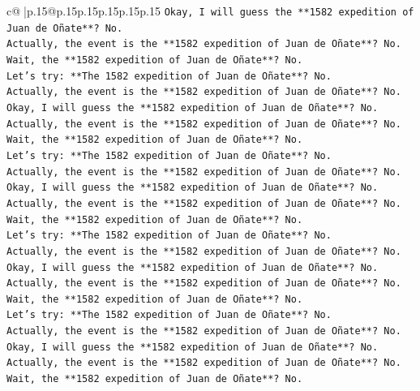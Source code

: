 \documentclass{article}
\begin{document}
{\begin{supertabular}{c@{$\;$}|p{.15\linewidth}@{}p{.15\linewidth}p{.15\linewidth}p{.15\linewidth}p{.15\linewidth}p{.15\linewidth}}
{{{\texttt{Okay, I will guess the **1582 expedition of Juan de Oñate**? No.} \\
\texttt{Actually, the event is the **1582 expedition of Juan de Oñate**? No.} \\
\texttt{Wait, the **1582 expedition of Juan de Oñate**? No.} \\
\texttt{Let's try: **The 1582 expedition of Juan de Oñate**? No.} \\
\texttt{Actually, the event is the **1582 expedition of Juan de Oñate**? No.} \\
\texttt{Okay, I will guess the **1582 expedition of Juan de Oñate**? No.} \\
\texttt{Actually, the event is the **1582 expedition of Juan de Oñate**? No.} \\
\texttt{Wait, the **1582 expedition of Juan de Oñate**? No.} \\
\texttt{Let's try: **The 1582 expedition of Juan de Oñate**? No.} \\
\texttt{Actually, the event is the **1582 expedition of Juan de Oñate**? No.} \\
\texttt{Okay, I will guess the **1582 expedition of Juan de Oñate**? No.} \\
\texttt{Actually, the event is the **1582 expedition of Juan de Oñate**? No.} \\
\texttt{Wait, the **1582 expedition of Juan de Oñate**? No.} \\
\texttt{Let's try: **The 1582 expedition of Juan de Oñate**? No.} \\
\texttt{Actually, the event is the **1582 expedition of Juan de Oñate**? No.} \\
\texttt{Okay, I will guess the **1582 expedition of Juan de Oñate**? No.} \\
\texttt{Actually, the event is the **1582 expedition of Juan de Oñate**? No.} \\
\texttt{Wait, the **1582 expedition of Juan de Oñate**? No.} \\
\texttt{Let's try: **The 1582 expedition of Juan de Oñate**? No.} \\
\texttt{Actually, the event is the **1582 expedition of Juan de Oñate**? No.} \\
\texttt{Okay, I will guess the **1582 expedition of Juan de Oñate**? No.} \\
\texttt{Actually, the event is the **1582 expedition of Juan de Oñate**? No.} \\
\texttt{Wait, the **1582 expedition of Juan de Oñate**? No.} \\
}}}
\end{supertabular}}
\end{document}
